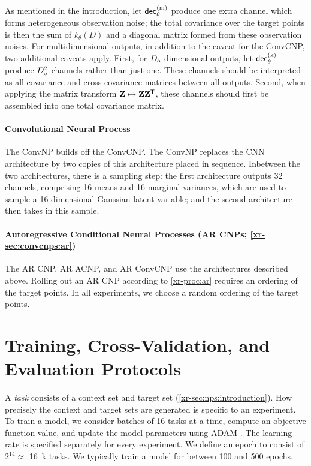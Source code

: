 \documentclass[12pt]{report}
\newcommand{\xrprefix}[1]{xr-#1}
\begin{document}
As mentioned in the introduction, let $\dec\us{(m)}_\theta$ produce one extra channel which forms heterogeneous observation noise;
the total covariance over the target points is then the sum of $k_\theta(D)$ and a diagonal matrix formed from these observation noises.
For multidimensional outputs, in addition to the caveat for the ConvCNP, two additional caveats apply.
First, for $D\ss{o}$-dimensional outputs, let $\dec\us{(k)}_\theta$ produce $D\ss{o}^2$ channels rather than just one. 
These channels should be interpreted as all covariance and cross-covariance matrices between all outputs.
Second, when applying the matrix transform $\mZ \mapsto \mZ \mZ^\T$, these channels should first be assembled into one total covariance matrix.

\paragraph{Convolutional Neural Process \parencite[ConvNP;][]{Foong:2020:Meta-Learning_Stationary_Stochastic_Process_Prediction}}
The ConvNP builds off the ConvCNP.
The ConvNP replaces the CNN architecture by two copies of this architecture placed in sequence.
Inbetween the two architectures, there is a sampling step:
the first architecture outputs 32 channels, comprising 16 means and 16 marginal variances, which are used to sample a 16-dimensional Gaussian latent variable;
and the second architecture then takes in this sample.

\paragraph{Autoregressive Conditional Neural Processes (AR CNPs; \cref{\xrprefix{sec:convcnps:ar}})}
The AR CNP, AR ACNP, and AR ConvCNP use the architectures described above.
Rolling out an AR CNP according to \cref{\xrprefix{proc:ar}} requires an ordering of the target points.
In all experiments, we choose a random ordering of the target points.

\section{Training, Cross-Validation, and Evaluation Protocols}
\label{sec:experimental_details:protocols}

A \emph{task} consists of a context set and target set (\cref{\xrprefix{sec:nps:introduction}}).
How precisely the context and target sets are generated is specific to an experiment.
To train a model, we consider batches of 16 tasks at a time, compute an objective function value, and update the model parameters using ADAM \parencite{Kingma:2014:Adam_A_Method_for_Stochastic}.
The learning rate is specified separately for every experiment.
We define an epoch to consist of $2^{14} \approx$ \SI{16}{k} tasks.
We typically train a model for between 100 and 500 epochs.
\end{document}
